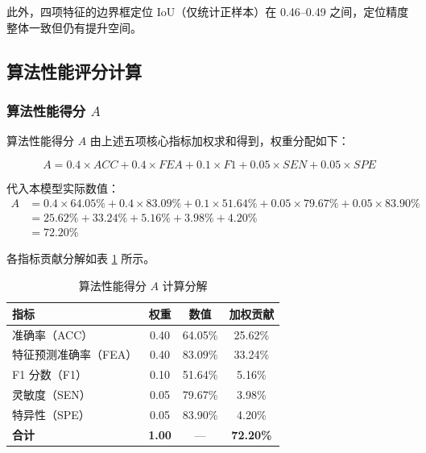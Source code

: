 \documentclass[UTF8]{ctexart}
\begin{document}
此外，四项特征的边界框定位 IoU（仅统计正样本）在 0.46--0.49 之间，定位精度整体一致但仍有提升空间。

\subsection{算法性能评分计算}

\subsubsection{算法性能得分 \(A\)}

算法性能得分 \(A\) 由上述五项核心指标加权求和得到，权重分配如下：

\begin{equation}
    A = 0.4 \times ACC + 0.4 \times FEA + 0.1 \times F1 + 0.05 \times SEN + 0.05 \times SPE
\end{equation}

代入本模型实际数值：
\begin{equation}
\begin{aligned}
    A &= 0.4 \times 64.05\% + 0.4 \times 83.09\% + 0.1 \times 51.64\% + 0.05 \times 79.67\% + 0.05 \times 83.90\% \\
      &= 25.62\% + 33.24\% + 5.16\% + 3.98\% + 4.20\% \\
      &= 72.20\%
\end{aligned}
\end{equation}

各指标贡献分解如表 \ref{tab:score_breakdown} 所示。

\begin{table}[htbp]
\centering
\caption{算法性能得分 \(A\) 计算分解}
\label{tab:score_breakdown}
\begin{tabular}{lccc}
\toprule
\textbf{指标} & \textbf{权重} & \textbf{数值} & \textbf{加权贡献} \\
\midrule
准确率（ACC） & 0.40 & 64.05\% & 25.62\% \\
特征预测准确率（FEA） & 0.40 & 83.09\% & 33.24\% \\
F1 分数（F1） & 0.10 & 51.64\% & 5.16\% \\
灵敏度（SEN） & 0.05 & 79.67\% & 3.98\% \\
特异性（SPE） & 0.05 & 83.90\% & 4.20\% \\
\midrule
\textbf{合计} & \textbf{1.00} & — & \textbf{72.20\%} \\
\bottomrule
\end{tabular}
\end{table}
\end{document}
